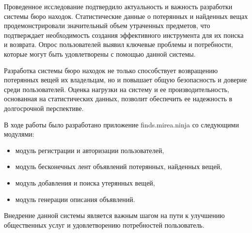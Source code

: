 \label{sec:conclusion}

Проведенное исследование подтвердило актуальность и важность разработки системы бюро находок. Статистические данные о потерянных и найденных вещах продемонстрировали значительный объем утраченных предметов, что подтверждает необходимость создания эффективного инструмента для их поиска и возврата. Опрос пользователей выявил ключевые проблемы и потребности, которые могут быть удовлетворены с помощью данной системы.

Разработка системы бюро находок не только способствует возвращению потерянных вещей их владельцам, но и повышает общую безопасность и доверие среди пользователей. Оценка нагрузки на систему и ее производительность, основанная на статистических данных, позволит обеспечить ее надежность в долгосрочной перспективе.

В ходе работы было разработано приложение finds.mirea.ninja со следующими модулями:
\begin{itemize}
	\item модуль регистрации и авторизации пользователей,
	\item модуль бесконечных лент объявлений потерянных, найденных вещей,
	\item модуль добавления и поиска утерянных вещей,
	\item модуль генерации описания объявлений.
\end{itemize}

Внедрение данной системы является важным шагом на пути к улучшению общественных услуг и удовлетворению потребностей пользователь.